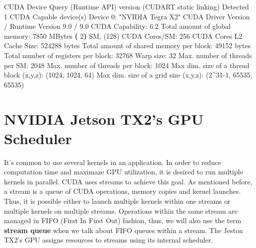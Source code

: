 \documentclass[
  12pt,
  a4paperpaper,
]{report}
\newenvironment{Shaded}{}{}
\newcommand{\BuiltInTok}[1]{#1}
\newcommand{\ExtensionTok}[1]{#1}
\newcommand{\KeywordTok}[1]{\textcolor[rgb]{0.00,0.44,0.13}{\textbf{#1}}}
\newcommand{\NormalTok}[1]{#1}
\newcommand{\StringTok}[1]{\textcolor[rgb]{0.25,0.44,0.63}{#1}}
\begin{document}
\begin{Shaded}
\begin{Highlighting}[]
\ExtensionTok{CUDA}\NormalTok{ Device Query (Runtime API) }\ExtensionTok{version}\NormalTok{ (CUDART static linking)}
\ExtensionTok{Detected}\NormalTok{ 1 CUDA Capable device(s)}
\ExtensionTok{Device}\NormalTok{ 0: }\StringTok{"NVIDIA Tegra X2"}
  \ExtensionTok{CUDA}\NormalTok{ Driver Version / Runtime Version     9.0 / 9.0}
  \ExtensionTok{CUDA}\NormalTok{ Capability:                          6.2}
  \ExtensionTok{Total}\NormalTok{ amount of global memory:            7850 MBytes }
  \KeywordTok{(} \ExtensionTok{2}\KeywordTok{)} \ExtensionTok{SM}\NormalTok{, (128) }\ExtensionTok{CUDA}\NormalTok{ Cores/SM:             256 CUDA Cores}
  \ExtensionTok{L2}\NormalTok{ Cache Size:                            524288 bytes}
  \ExtensionTok{Total}\NormalTok{ amount of shared memory per block:  49152 bytes}
  \ExtensionTok{Total}\NormalTok{ number of registers per block:      32768}
  \ExtensionTok{Warp}\NormalTok{ size:                                32}
  \ExtensionTok{Max.}\NormalTok{ number of threads per SM:            2048}
  \ExtensionTok{Max.}\NormalTok{ number of threads per block:         1024}
  \ExtensionTok{Max}\NormalTok{ dim. size of a thread block (x,y,z)}\BuiltInTok{:}\NormalTok{  (1024, 1024, 64)}
  \ExtensionTok{Max}\NormalTok{ dim. size of a grid size    (x,y,z)}\BuiltInTok{:}\NormalTok{  (2\^{}31{-}1, 65535, 65535)}
\end{Highlighting}
\end{Shaded}

\hypertarget{nvidia-jetson-tx2s-gpu-scheduler}{%
\section{NVIDIA Jetson TX2's GPU
Scheduler}\label{nvidia-jetson-tx2s-gpu-scheduler}}

It's common to use several kernels in an application. In order to reduce
computation time and maximaze GPU utilization, it is desired to run
multiple kernels in parallel. CUDA uses streams to achieve this goal. As
mentioned before, a stream is a queue of CUDA operations, memory copies
and kernel launches. Thus, it is possible either to launch multiple
kernels within one streams or multiple kernels on multiple streams.
Operations within the same stream are managed in FIFO (First In First
Out) fashion, thus, we will also use the term \textbf{stream queue} when
we talk about FIFO queues within a stream. The Jeston TX2's GPU assigns
resources to streams using its internal scheduler.
\end{document}
